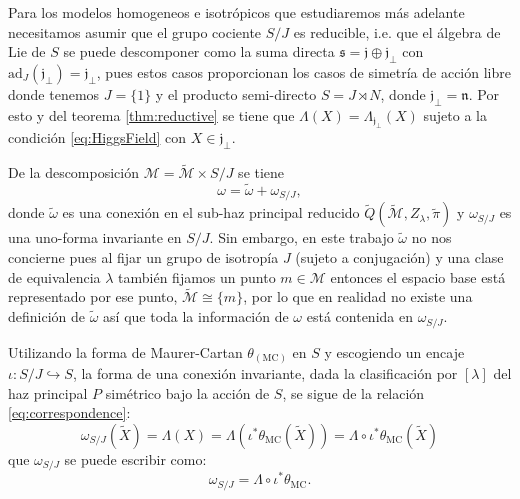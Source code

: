 Para los modelos homogeneos e isotr\'{o}picos que estudiaremos m\'{a}s adelante necesitamos asumir que el grupo cociente $S/J$ es reducible, i.e. que el \'{a}lgebra de Lie de $S$ se puede descomponer como la suma directa $\mathfrak{s} = \mathfrak{j} \oplus \mathfrak{j}_{\perp}$ con $\mathrm{ad}_{J}(\mathfrak{j_{\perp}}) = \mathfrak{j_{\perp}}$, pues estos casos proporcionan los casos de simetr\'{i}a de acci\'{o}n libre donde tenemos $J =\{1\}$ y el producto semi-directo $S = J \rtimes N$, donde $\mathfrak{j_{\perp}} = \mathfrak{n}$. Por esto y del teorema \ref{thm:reductive} se tiene que $\Lambda (X) = \Lambda_{\mathfrak{j}_{\perp}} (X)$ sujeto a la condici\'{o}n \eqref{eq:HiggsField} con $X \in \mathfrak{j}_{\perp}$.

De la descomposici\'{o}n $\mathcal{M} = \mathcal{\tilde{M}} \times S/J$ se tiene
%
\begin{equation}
\omega = \tilde{\omega} + \omega_{S/J},
\end{equation}
%
donde $\tilde{\omega}$ es una conexi\'{o}n en el sub-haz principal reducido $\tilde{Q}(\tilde{\mathcal{M}}, Z_{\lambda}, \tilde{\pi})$ y $\omega_{S/J}$ es una uno-forma invariante en $S/J$. Sin embargo, en este trabajo $\tilde{\omega}$ no nos concierne pues al fijar un grupo de isotrop\'{i}a $J$ (sujeto a conjugaci\'{o}n) y una clase de equivalencia $\lambda$ tambi\'{e}n fijamos un punto $m \in \mathcal{M}$ entonces el espacio base est\'{a} representado por ese punto, $\tilde{\mathcal{M}} \cong \{m\}$, por lo que en realidad no existe una definici\'{o}n de $\tilde{\omega}$ as\'{i} que toda la informaci\'{o}n de $\omega$ est\'{a} contenida en $\omega_{S/J}$.

Utilizando la forma de Maurer-Cartan $\theta_{(\mathrm{MC})}$ en $S$ y escogiendo un encaje $\iota: S/J \hookrightarrow S$, la forma de una conexi\'{o}n invariante, dada la clasificaci\'{o}n por $[\lambda]$ del haz principal $P$ sim\'{e}trico bajo la acci\'{o}n de $S$, se sigue de la relaci\'{o}n \eqref{eq:correspondence}:
%
\begin{equation*}
\omega_{S/J} (\tilde{X}) = \Lambda (X) = \Lambda (\iota^{*} \theta_{\mathrm{MC}} (\tilde{X})) = \Lambda \circ \iota^{*} \theta_{\mathrm{MC}} (\tilde{X})
\end{equation*}
%
que $\omega_{S/J}$ se puede escribir como:
%
\begin{equation}
\omega_{S/J} = \Lambda \circ \iota^{*} \theta_{\mathrm{MC}}.
\end{equation}